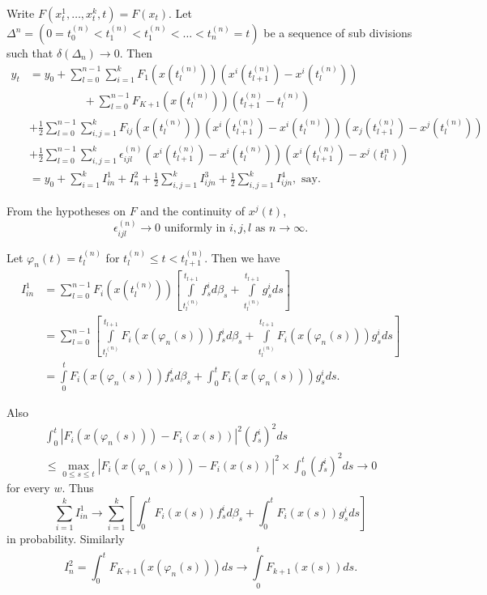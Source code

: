 \begin{pot*}
 Write $F(x^1_t , \ldots , x^k_t , t ) = F(x_t) $. Let $\Delta^n =
  (0 = t_0^{(n)} < t_1^{(n)} < t^{(n)}_{1}<\ldots < t^{(n)}_n = t)$ be a
  sequence of sub divisions such that $\delta (\Delta _n) \to
  0$. Then  
\begin{align*}
    y_t &= y_0 + \sum^{ n - 1}_{ l = 0 } \sum^k_{ i = 1} F_1 \left(
    x(t_l^{(n)})\right) \left(x^i (t_{ l +1}^{(n)} ) - x ^i (t_l^{(n)})\right)\\ 
    & \hspace{2cm} + \sum_{
      l = 0}^{ n - 1} F_{ K +1} \left(x(t_l^{(n)})\right) \left(t^{(n)}_{l + 1} -
    t^{(n)}_l\right) \\ 
    &+ \frac{1}{2} \sum_{ l = 0}^{ n - 1} \sum^{k}_{i, j = 1} F_{ij}
    \left(x(t_l^{(n)})\right) \left(x^i(t_{l+1}^{(n)})  -
    x^i (t_l^{(n)}) \right) \left(x_j (t_{l+1}^{(n)})-x^j
    (t_l^{(n)})\right)\\  
    &+ \frac{1}{2} \sum_{l=0}^{n-1} \sum_{i, j=1}^{k} \epsilon^{(n)} _{
      ijl} \left(x^i (t_{l +1}^{(n)})-x^{i}(t_l^{(n)})\right) \left( x^i
    (t_{l+1}^{(n)}) - x^j (t_{l}^n)\right)\\ 
    & = y_0 + \sum^{k}_{i = 1} I^1_{in} + I^2_{n} + \frac{1}{2}
    \sum_{ i, j = 1}^k I^3_{ijn} + \frac{1}{2} \sum^{k}_{ i, j =1 }
    I^4_{ijn}, \text{\ say}.  
  \end{align*}

From the hypotheses on $F$ and the continuity of $x^j (t)$, 
$$  
\epsilon^{(n)}_{ijl} \to 0\text{\ uniformly in \ } i, j,
l\text{\ as\ } n \to \infty.
$$  
  
Let $\varphi_n(t) = t_l^{(n)}$ for $t^{(n)}_{l} \leq t <
t_{l+1}^{(n)}$. Then we have   
\begin{align*}
I^1_{in} & = \sum^{n-1}_{l=0} F_i (x(t_l^{(n)})) \left[
      \int\limits^{t_{ l +1}}_{t_l^{(n)}} f^i_s d \beta_s +
      \int\limits^{t_{l +1}} _{ t_l^{(n)}}g^{i}_{s}ds\right]\\ 
    & = \sum^{n-1}_{l=0} \left[ \int\limits^{t_{ l +1} }_{t_l^
        {(n)}} F_i (x( \varphi_n (s))) f^i_s d \beta_s +
      \int\limits^{t_{ l +1} }_{t_l^{(n)}} F_i (x( \varphi_n (s)))
      g^i_s ds\right] \\ 
    & = \int\limits^t_0 F_i (x( \varphi _n (s))) f^i _s d \beta _s +
    \int^t_0 F_{i}(x( \varphi_n (s))) g_s^i ds.  
\end{align*}\pageoriginale
  
Also 
\begin{multline*}
    \int^t_0 | F_i ( x ( \varphi _n (s))) - F_i (x(s)) |^2 (f^i_s)^2 ds\\
    \leq \max_{ 0 \leq s \leq t} | F_i ( x ( \varphi_n (s))) - F_i (x(s)
    )|^{2} \times \int^t _0 (f^i _s)^2 ds \to 0 
  \end{multline*}
  for every $w$. Thus 
  $$
  \sum^k_{ i = 1} I^1_{in} \to \sum_{i=1}^k \left[ \int ^t_0 F_i
    (x(s)) f^i _s d \beta _s + \int^t _0 F_i (x(s)) g^i _s ds \right] 
  $$
  in probability. Similarly 
  $$
  I^2_n = \int^t_0 F_{K + 1 }(x(\varphi_n (s))) ds \to \int\limits^t_0
  F_{ k +1} (x(s) )ds.  
  $$


\end{pot*}
